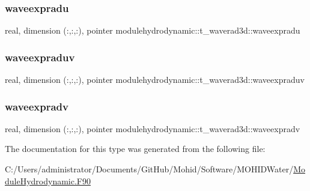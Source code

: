\subsubsection{\texorpdfstring{waveexpradu}{waveexpradu}}
{\footnotesize\ttfamily real, dimension (\+:,\+:,\+:), pointer modulehydrodynamic\+::t\+\_\+waverad3d\+::waveexpradu\hspace{0.3cm}{\ttfamily [private]}}

\mbox{\label{structmodulehydrodynamic_1_1t__waverad3d_a13df69527550ab18689f8b0565cf3caf}} 
\subsubsection{\texorpdfstring{waveexpraduv}{waveexpraduv}}
{\footnotesize\ttfamily real, dimension (\+:,\+:,\+:), pointer modulehydrodynamic\+::t\+\_\+waverad3d\+::waveexpraduv\hspace{0.3cm}{\ttfamily [private]}}

\mbox{\label{structmodulehydrodynamic_1_1t__waverad3d_a40d4d42334dc3ce15149a505d4c03564}} 
\subsubsection{\texorpdfstring{waveexpradv}{waveexpradv}}
{\footnotesize\ttfamily real, dimension (\+:,\+:,\+:), pointer modulehydrodynamic\+::t\+\_\+waverad3d\+::waveexpradv\hspace{0.3cm}{\ttfamily [private]}}



The documentation for this type was generated from the following file\+:\begin{DoxyCompactItemize}
\item 
C\+:/\+Users/administrator/\+Documents/\+Git\+Hub/\+Mohid/\+Software/\+M\+O\+H\+I\+D\+Water/\mbox{\hyperlink{_module_hydrodynamic_8_f90}{Module\+Hydrodynamic.\+F90}}\end{DoxyCompactItemize}

